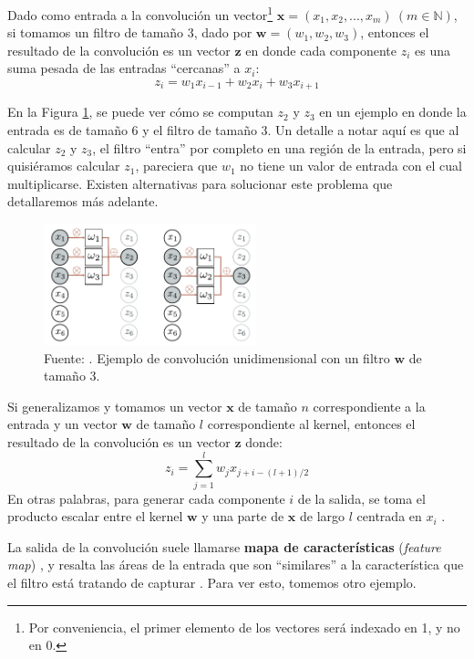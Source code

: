 \documentclass[../../main.tex]{subfiles}
\begin{document}
Dado como entrada a la convolución un vector\footnote{Por conveniencia, el primer elemento
de los vectores será indexado en 1, y no en 0.} \(\bm{x} = (x_1, x_2, ..., x_m)\ (m \in
\mathbb{N})\), si tomamos un filtro de tamaño 3, dado por \(\bm{w}=(w_1, w_2, w_3)\),
entonces el resultado de la convolución es un vector \(\bm{z}\) en donde cada componente
\(z_i\) es una suma pesada de las entradas ``cercanas'' a \(x_i\):
\[z_i = w_1 x_{i-1} + w_2 x_{i} + w_3 x_{i+1}\]


En la Figura \ref{fig:conv1d-example}, se puede ver cómo se computan \(z_2\) y \(z_3\) en
un ejemplo en donde la entrada es de tamaño 6 y el filtro de tamaño 3. Un detalle a notar
aquí es que al calcular \(z_2\) y \(z_3\), el filtro ``entra'' por completo en una región
de la entrada, pero si quisiéramos calcular \(z_1\), pareciera que \(w_1\) no tiene un
valor de entrada con el cual multiplicarse. Existen alternativas para solucionar este
problema que detallaremos más adelante.

\begin{figure}
    \centering
    \includegraphics[width=0.55\textwidth]{figs/conv1d-example1.png}
    \caption{Fuente: \cite{prince2024understanding}. Ejemplo de convolución unidimensional
    con un filtro \(\bm{w}\) de tamaño 3.}
    \label{fig:conv1d-example}
\end{figure}

Si generalizamos y tomamos un vector \(\bm{x}\) de tamaño \(n\) correspondiente
a la entrada y un vector \(\bm{w}\) de tamaño \(l\) correspondiente al kernel,
entonces el resultado de la convolución es un vector \(\bm{z}\) donde:
\begin{equation}
    z_i = \sum_{j=1}^l w_j x_{j+i-(l+1)/2}
    \label{eq:convolution}
\end{equation}
En otras palabras, para generar cada componente \(i\) de la salida, se toma el producto
escalar entre el kernel \(\bm{w}\) y una parte de \(\bm{x}\) de largo \(l\) centrada en
\(x_i\) \cite{ai-a-modern-approach}.

La salida de la convolución suele llamarse \textbf{mapa de características}
(\textit{feature map}) \cite{deep-learning}, y resalta las áreas de la entrada que son
``similares'' a la característica que el filtro está tratando de capturar
\cite{hands-on-ML-sklearn-tf}. Para ver esto, tomemos otro ejemplo.
\end{document}
